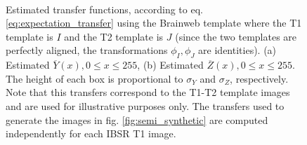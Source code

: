 \begin{figure}[H]
\centering
    \\
    \caption{Estimated transfer functions, according to eq. \eqref{eq:expectation_transfer} using the Brainweb template where the T1 template is $I$ and the T2 template is $J$
    (since the two templates are perfectly aligned, the transformations $\phi_{I}, \phi_{J}$ are identities). (a) Estimated $\overline{Y}(x), 0\leq x \leq 255$, (b) Estimated $\overline{Z}(x), 0\leq x \leq 255$. The height of each box is proportional to $\sigma_{Y}$ and $\sigma_{Z}$, respectively. Note that this transfers correspond to the T1-T2 template images and are used for illustrative purposes only. The transfers used to generate the images in fig. \ref{fig:semi_synthetic} are computed independently for each IBSR T1 image.}
\label{fig:transfers}
\end{figure}


